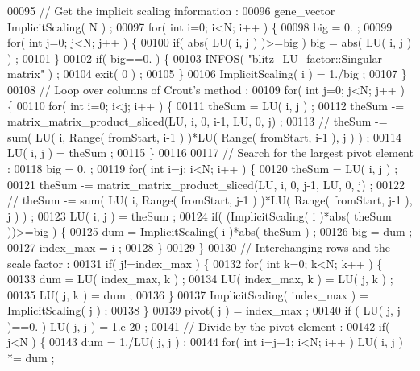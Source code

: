 \begin{DoxyCode}
00095     \textcolor{comment}{// Get the implicit scaling information :}
00096     gene\_vector ImplicitScaling( N ) ;
00097     \textcolor{keywordflow}{for}( \textcolor{keywordtype}{int} i=0; i<N; i++ ) \{
00098       big = 0. ;
00099       \textcolor{keywordflow}{for}( \textcolor{keywordtype}{int} j=0; j<N; j++ ) \{
00100     \textcolor{keywordflow}{if}( abs( LU( i, j ) )>=big ) big = abs( LU( i, j ) ) ;
00101       \}
00102       \textcolor{keywordflow}{if}( big==0. ) \{
00103     INFOS( \textcolor{stringliteral}{"blitz\_LU\_factor::Singular matrix"} ) ;
00104     exit( 0 ) ;
00105       \}
00106       ImplicitScaling( i ) = 1./big ;
00107     \}
00108     \textcolor{comment}{// Loop over columns of Crout's method :}
00109     \textcolor{keywordflow}{for}( \textcolor{keywordtype}{int} j=0; j<N; j++ ) \{
00110       \textcolor{keywordflow}{for}( \textcolor{keywordtype}{int} i=0; i<j; i++ ) \{
00111     theSum = LU( i, j ) ;
00112     theSum -= matrix\_matrix\_product\_sliced(LU, i, 0, i-1, LU, 0, j) ;
00113     \textcolor{comment}{//  theSum -= sum( LU( i, Range( fromStart, i-1 ) )*LU( Range( fromStart, i-1 ), j ) ) ;}
00114     LU( i, j ) = theSum ;
00115       \}
00116       
00117       \textcolor{comment}{// Search for the largest pivot element :}
00118       big = 0. ;
00119       \textcolor{keywordflow}{for}( \textcolor{keywordtype}{int} i=j; i<N; i++ ) \{
00120     theSum = LU( i, j ) ;
00121     theSum -= matrix\_matrix\_product\_sliced(LU, i, 0, j-1, LU, 0, j) ;
00122     \textcolor{comment}{//  theSum -= sum( LU( i, Range( fromStart, j-1 ) )*LU( Range( fromStart, j-1 ), j ) ) ;}
00123     LU( i, j ) = theSum ;
00124     \textcolor{keywordflow}{if}( (ImplicitScaling( i )*abs( theSum ))>=big ) \{
00125       dum = ImplicitScaling( i )*abs( theSum ) ;
00126       big = dum ;
00127       index\_max = i ;
00128     \}
00129       \}
00130       \textcolor{comment}{// Interchanging rows and the scale factor :}
00131       \textcolor{keywordflow}{if}( j!=index\_max ) \{
00132     \textcolor{keywordflow}{for}( \textcolor{keywordtype}{int} k=0; k<N; k++ ) \{
00133       dum = LU( index\_max, k ) ;
00134       LU( index\_max, k ) = LU( j, k ) ;
00135       LU( j, k ) = dum ;
00136     \}
00137     ImplicitScaling( index\_max ) = ImplicitScaling( j ) ;
00138       \}
00139       pivot( j ) = index\_max ;
00140       \textcolor{keywordflow}{if} ( LU( j, j )==0. ) LU( j, j ) = 1.e-20 ;
00141       \textcolor{comment}{// Divide by the pivot element :}
00142       \textcolor{keywordflow}{if}( j<N ) \{
00143     dum = 1./LU( j, j ) ;
00144     \textcolor{keywordflow}{for}( \textcolor{keywordtype}{int} i=j+1; i<N; i++ ) LU( i, j ) *= dum ;

\end{DoxyCode}
